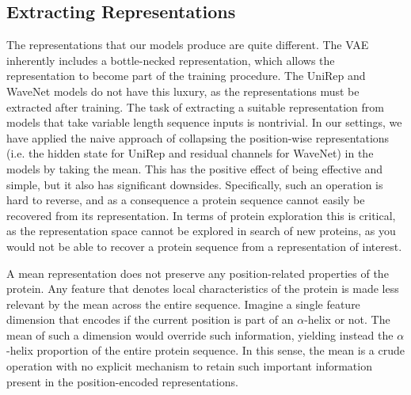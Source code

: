 \subsection{Extracting Representations}
\label{sec:extracting_representations}
The representations that our models produce are quite different. The VAE inherently includes a bottle-necked representation, which allows the representation to become part of the training procedure. The UniRep and WaveNet models do not have this luxury, as the representations must be extracted after training. The task of extracting a suitable representation from models that take variable length sequence inputs is nontrivial. In our settings, we have applied the naive approach of collapsing the position-wise representations (i.e. the hidden state for UniRep and residual channels for WaveNet) in the models by taking the mean. This has the positive effect of being effective and simple, but it also has significant downsides. Specifically, such an operation is hard to reverse, and as a consequence a protein sequence cannot easily be recovered from its representation. In terms of protein exploration this is critical, as the representation space cannot be explored in search of new proteins, as you would not be able to recover a protein sequence from a representation of interest.

A mean representation does not preserve any position-related properties of the protein. Any feature that denotes local characteristics of the protein is made less relevant by the mean across the entire sequence. Imagine a single feature dimension that encodes if the current position is part of an $\alpha$-helix or not. The mean of such a dimension would override such information, yielding instead the $\alpha$-helix proportion of the entire protein sequence. In this sense, the mean is a crude operation with no explicit mechanism to retain such important information present in the position-encoded representations.

